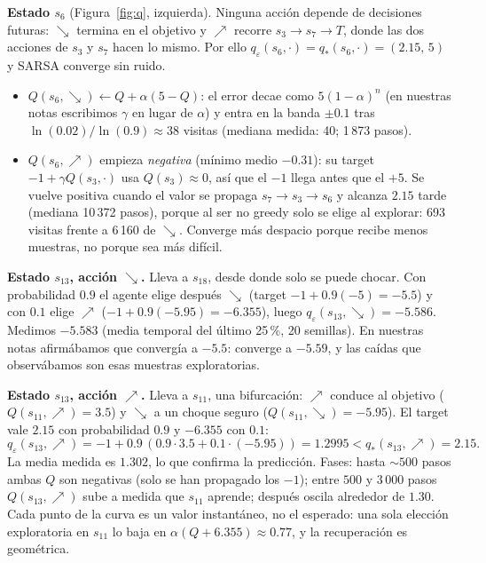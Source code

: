 \documentclass[11pt,a4paper]{article}
\newcommand{\UR}{{\nearrow}}
\newcommand{\DR}{{\searrow}}
\newcommand{\qe}{q_\varepsilon}
\begin{document}
\textbf{Estado $s_6$} (Figura~\ref{fig:q}, izquierda). Ninguna acción depende de decisiones futuras: $\DR$ termina en el objetivo y $\UR$ recorre $s_3\to s_7\to T$, donde las dos acciones de $s_3$ y $s_7$ hacen lo mismo. Por ello $\qe(s_6,\cdot)=q_*(s_6,\cdot)=(2.15,\,5)$ y SARSA converge sin ruido.
\begin{itemize}\itemsep0pt
\item $Q(s_6,\DR)\leftarrow Q+\alpha(5-Q)$: el error decae como $5(1-\alpha)^n$ (en nuestras notas escribimos $\gamma$ en lugar de $\alpha$) y entra en la banda $\pm0.1$ tras $\ln(0.02)/\ln(0.9)\approx38$ visitas (mediana medida: 40; 1\,873 pasos).
\item $Q(s_6,\UR)$ empieza \emph{negativa} (mínimo medio $-0.31$): su target $-1+\gamma Q(s_3,\cdot)$ usa $Q(s_3)\approx0$, así que el $-1$ llega antes que el $+5$. Se vuelve positiva cuando el valor se propaga $s_7\to s_3\to s_6$ y alcanza $2.15$ tarde (mediana 10\,372 pasos), porque al ser no greedy solo se elige al explorar: 693 visitas frente a 6\,160 de $\DR$. Converge más despacio porque recibe menos muestras, no porque sea más difícil.
\end{itemize}

\textbf{Estado $s_{13}$, acción $\DR$.} Lleva a $s_{18}$, desde donde solo se puede chocar. Con probabilidad $0.9$ el agente elige después $\DR$ (target $-1+0.9(-5)=-5.5$) y con $0.1$ elige $\UR$ ($-1+0.9(-5.95)=-6.355$), luego $\qe(s_{13},\DR)=-5.586$. Medimos $-5.583$ (media temporal del último 25\,\%, 20 semillas). En nuestras notas afirmábamos que convergía a $-5.5$: converge a $-5.59$, y las caídas que observábamos son esas muestras exploratorias.

\textbf{Estado $s_{13}$, acción $\UR$.} Lleva a $s_{11}$, una bifurcación: $\UR$ conduce al objetivo ($Q(s_{11},\UR)=3.5$) y $\DR$ a un choque seguro ($Q(s_{11},\DR)=-5.95$). El target vale $2.15$ con probabilidad $0.9$ y $-6.355$ con $0.1$:
\begin{equation}
\qe(s_{13},\UR)=-1+0.9\,(0.9\cdot3.5+0.1\cdot(-5.95))=1.2995<q_*(s_{13},\UR)=2.15 .
\end{equation}
La media medida es $1.302$, lo que confirma la predicción. Fases: hasta $\sim\!500$ pasos ambas $Q$ son negativas (solo se han propagado los $-1$); entre $500$ y $3\,000$ pasos $Q(s_{13},\UR)$ sube a medida que $s_{11}$ aprende; después oscila alrededor de $1.30$. Cada punto de la curva es un valor instantáneo, no el esperado: una sola elección exploratoria en $s_{11}$ lo baja en $\alpha(Q+6.355)\approx0.77$, y la recuperación es geométrica.
\end{document}
